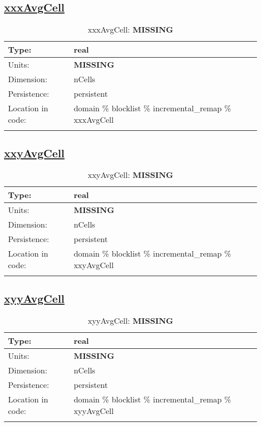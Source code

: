\subsection[xxxAvgCell]{\hyperref[sec:var_tab_incremental_remap]{xxxAvgCell}}
\label{subsec:var_sec_incremental_remap_xxxAvgCell}
\begin{center}
\begin{longtable}{| p{2.0in} | p{4.0in} |}
        \hline 
        Type: & real \\
        \hline 
        Units: & {\bf \color{red} MISSING} \\
        \hline 
        Dimension: & nCells \\
        \hline 
        Persistence: & persistent \\
        \hline 
         Location in code: & domain \% blocklist \% incremental\_remap \% xxxAvgCell \\
         \hline 
    \caption{xxxAvgCell: {\bf \color{red} MISSING}}
\end{longtable}
\end{center}
\subsection[xxyAvgCell]{\hyperref[sec:var_tab_incremental_remap]{xxyAvgCell}}
\label{subsec:var_sec_incremental_remap_xxyAvgCell}
\begin{center}
\begin{longtable}{| p{2.0in} | p{4.0in} |}
        \hline 
        Type: & real \\
        \hline 
        Units: & {\bf \color{red} MISSING} \\
        \hline 
        Dimension: & nCells \\
        \hline 
        Persistence: & persistent \\
        \hline 
         Location in code: & domain \% blocklist \% incremental\_remap \% xxyAvgCell \\
         \hline 
    \caption{xxyAvgCell: {\bf \color{red} MISSING}}
\end{longtable}
\end{center}
\subsection[xyyAvgCell]{\hyperref[sec:var_tab_incremental_remap]{xyyAvgCell}}
\label{subsec:var_sec_incremental_remap_xyyAvgCell}
\begin{center}
\begin{longtable}{| p{2.0in} | p{4.0in} |}
        \hline 
        Type: & real \\
        \hline 
        Units: & {\bf \color{red} MISSING} \\
        \hline 
        Dimension: & nCells \\
        \hline 
        Persistence: & persistent \\
        \hline 
         Location in code: & domain \% blocklist \% incremental\_remap \% xyyAvgCell \\
         \hline 
    \caption{xyyAvgCell: {\bf \color{red} MISSING}}
\end{longtable}
\end{center}
